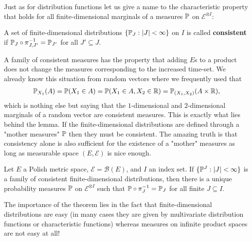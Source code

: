 Just as for distribution functions let us give a name to the characteristic property that holds for all finite-dimensional marginals of a measures $\P$ on $\mathcal E^{\otimes I}$:
\begin{ldef}
	\begin{deff}
		A set of finite-dimensional distributions $\{\P_J: |J|<\infty\}$ on $I$ is called \textbf{consistent} if $\P_J \circ \pi^{-1}_{J,J'}=\P_{J'}$ for all $J'\subseteq J$.
	\end{deff}
\end{ldef}
A family of consistent measures has the property that adding $E$s to a product does not change the measures corresponding to the increased time-set. We already know this situation from random vectors where we frequently used that 
\begin{align*}
	\P_{X_1}(A)=\P(X_1\in A)=\P(X_1\in A, X_2\in \R)=\P_{(X_1,X_2)}(A\times \R),
\end{align*}
which is nothing else but saying that the $1$-dimensional and $2$-dimensional marginals of a random vector are consistent measures. This is exactly what lies behind the lemma. If the finite-dimensional distributions are defined through a "{}mother measures"{} $\P$ then they must be consistent. The amazing truth is that consistency alone is also sufficient for the existence of a "mother"{} measures as long as measurable space $(E,\mathcal E)$ is nice enough.
\begin{lsuperwichtigersatzExistence}
\begin{theorem}\label{Kolm}
	Let $E$ a Polish metric space, $\mathcal E=\mathcal B(E)$, and $I$ an index set. If $\{\P^J:|J|<\infty\}$ is a family of consistent finite-dimensional distributions, then there is a unique probability measures $\P$ on $\mathcal E^{\otimes I}$ such that $\P\circ \pi^{-1}_J=\P_J$ for all finite $J\subseteq I$.
\end{theorem}
\end{lsuperwichtigersatzExistence}
The importance of the theorem lies in the fact that finite-dimensional distributions are easy (in many cases they are given by multivariate distribution functions or characteristic functions) whereas measures on infinite product spaces are not easy at all!\smallskip

